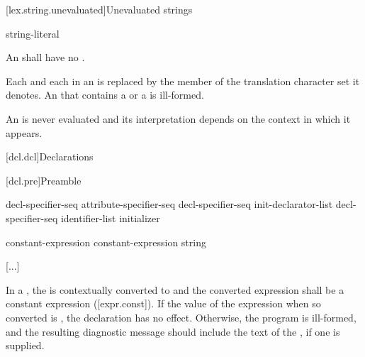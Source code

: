 \documentclass{wg21}
\begin{document}
\begin{addedblock}

[lex.string.unevaluated]{Unevaluated strings}

\begin{bnf}
    \br
    string-literal
\end{bnf}

An  shall have no  .

Each  and each  in an  is replaced by the member of the translation character set it denotes.
An  that contains a 
or a  is ill-formed.

An  is never evaluated and its interpretation depends on the context in which it appears.
\end{addedblock}



[dcl.dcl]{Declarations}%

[dcl.pre]{Preamble}

\begin{bnf}
    \br
    decl-specifier-seq  \terminal{;}\br
    attribute-specifier-seq decl-specifier-seq init-declarator-list \terminal{;}\br
     decl-specifier-seq  \terminal{[} identifier-list \terminal{]} initializer \terminal{;}
\end{bnf}

\begin{bnf}
    \br
     \terminal{(} constant-expression \terminal{)} \terminal{;}\br
     \terminal{(} constant-expression \terminal{,} string \terminal{)} \terminal{;}
\end{bnf}

[...]

\pnum
{}%
In a , the
is contextually converted to  and the converted expression shall be a constant expression ([expr.const]).
If the value of the expression when
so converted is , the declaration has no
effect. Otherwise, the program is ill-formed, and the resulting
diagnostic message should include the text of
the , if one is supplied.
\end{document}
